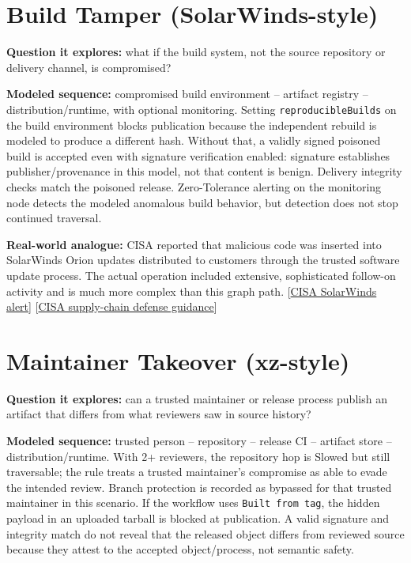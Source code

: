 \documentclass[11pt,oneside]{book}
\newcommand{\code}[1]{\texttt{\small #1}}
\begin{document}
\section{Build Tamper (SolarWinds-style)}
\textbf{Question it explores:} what if the build system, not the source repository or delivery channel, is compromised?

\textbf{Modeled sequence:} compromised build environment -- artifact registry -- distribution/runtime, with optional monitoring. Setting \code{reproducibleBuilds} on the build environment blocks publication because the independent rebuild is modeled to produce a different hash. Without that, a validly signed poisoned build is accepted even with signature verification enabled: signature establishes publisher/provenance in this model, not that content is benign. Delivery integrity checks match the poisoned release. Zero-Tolerance alerting on the monitoring node detects the modeled anomalous build behavior, but detection does not stop continued traversal.

\textbf{Real-world analogue:} CISA reported that malicious code was inserted into SolarWinds Orion updates distributed to customers through the trusted software update process. The actual operation included extensive, sophisticated follow-on activity and is much more complex than this graph path. [\href{https://www.cisa.gov/news-events/alerts/2020/12/13/active-exploitation-solarwinds-software}{CISA SolarWinds alert}] [\href{https://www.cisa.gov/sites/default/files/publications/defending_against_software_supply_chain_attacks_508_1.pdf}{CISA supply-chain defense guidance}]

\section{Maintainer Takeover (xz-style)}
\textbf{Question it explores:} can a trusted maintainer or release process publish an artifact that differs from what reviewers saw in source history?

\textbf{Modeled sequence:} trusted person -- repository -- release CI -- artifact store -- distribution/runtime. With 2+ reviewers, the repository hop is Slowed but still traversable; the rule treats a trusted maintainer's compromise as able to evade the intended review. Branch protection is recorded as bypassed for that trusted maintainer in this scenario. If the workflow uses \code{Built from tag}, the hidden payload in an uploaded tarball is blocked at publication. A valid signature and integrity match do not reveal that the released object differs from reviewed source because they attest to the accepted object/process, not semantic safety.
\end{document}

